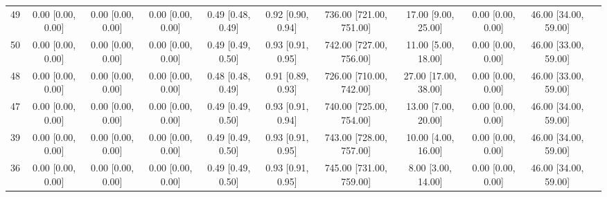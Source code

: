 \documentclass[8pt]{article}
\begin{document}
\begin{center}
\begin{footnotesize}
\begin{longtable}{|ccccccccccc|}
 49 &  0.00 [0.00, 0.00] &  0.00 [0.00, 0.00] &  0.00 [0.00, 0.00] &  0.49 [0.48, 0.49] &  0.92 [0.90, 0.94] &  736.00 [721.00, 751.00] &      17.00 [9.00, 25.00] &     0.00 [0.00, 0.00] &  46.00 [34.00, 59.00] \\
 50 &  0.00 [0.00, 0.00] &  0.00 [0.00, 0.00] &  0.00 [0.00, 0.00] &  0.49 [0.49, 0.50] &  0.93 [0.91, 0.95] &  742.00 [727.00, 756.00] &      11.00 [5.00, 18.00] &     0.00 [0.00, 0.00] &  46.00 [33.00, 59.00] \\
 48 &  0.00 [0.00, 0.00] &  0.00 [0.00, 0.00] &  0.00 [0.00, 0.00] &  0.48 [0.48, 0.49] &  0.91 [0.89, 0.93] &  726.00 [710.00, 742.00] &     27.00 [17.00, 38.00] &     0.00 [0.00, 0.00] &  46.00 [33.00, 59.00] \\
 47 &  0.00 [0.00, 0.00] &  0.00 [0.00, 0.00] &  0.00 [0.00, 0.00] &  0.49 [0.49, 0.50] &  0.93 [0.91, 0.94] &  740.00 [725.00, 754.00] &      13.00 [7.00, 20.00] &     0.00 [0.00, 0.00] &  46.00 [34.00, 59.00] \\
 39 &  0.00 [0.00, 0.00] &  0.00 [0.00, 0.00] &  0.00 [0.00, 0.00] &  0.49 [0.49, 0.50] &  0.93 [0.91, 0.95] &  743.00 [728.00, 757.00] &      10.00 [4.00, 16.00] &     0.00 [0.00, 0.00] &  46.00 [34.00, 59.00] \\
 36 &  0.00 [0.00, 0.00] &  0.00 [0.00, 0.00] &  0.00 [0.00, 0.00] &  0.49 [0.49, 0.50] &  0.93 [0.91, 0.95] &  745.00 [731.00, 759.00] &       8.00 [3.00, 14.00] &     0.00 [0.00, 0.00] &  46.00 [34.00, 59.00] \\
\end{longtable}
\end{footnotesize}
\end{center}
\end{document}

